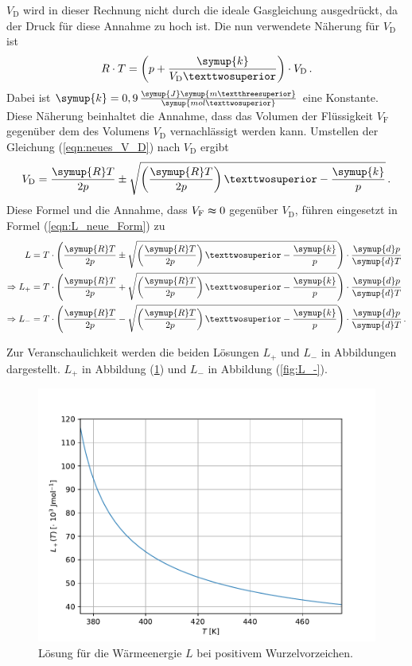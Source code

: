     $V_{\text{D}}$ wird in dieser Rechnung nicht durch die ideale Gasgleichung ausgedrückt, da der Druck für diese
    Annahme zu hoch ist. Die nun verwendete Näherung für $V_{\text{D}}$ ist
    \begin{equation}
      R \cdot T = \left(p + \frac{\symup{k}}{V_{\text{D}}²}\right) \cdot V_{\text{D}} \, .
      \label{eqn:neues_V_D}
    \end{equation}
    Dabei ist $\symup{k} = 0,9 \, \frac{\symup{J}\symup{m³}}{\symup{mol²}}$ eine Konstante. Diese Näherung 
    beinhaltet die Annahme, dass das Volumen der Flüssigkeit $V_{\text{F}}$ gegenüber dem des Volumens $V_{\text{D}}$ vernachlässigt
    werden kann. 
    Umstellen der Gleichung (\ref{eqn:neues_V_D}) nach $V_{\text{D}}$ ergibt
    \begin{equation}
      V_{\text{D}} = \frac{\symup{R}T}{2 p} \pm \sqrt{\left(\frac{\symup{R}T}{2p}\right)² - \frac{\symup{k}}{p}} \, .
    \end{equation}
    Diese Formel und die Annahme, dass $V_{\text{F}} \thickapprox 0$ gegenüber $V_{\text{D}}$, führen eingesetzt in Formel (\ref{eqn:L_neue_Form}) zu 
    \begin{align*}
      L &= T \cdot \left(\frac{\symup{R}T}{2 p} \pm \sqrt{\left(\frac{\symup{R}T}{2p}\right)² - \frac{\symup{k}}{p}}\right) \cdot \frac{\symup{d}p}{\symup{d}T} \\
      \Rightarrow L_+ &= T \cdot \left(\frac{\symup{R}T}{2 p} + \sqrt{\left(\frac{\symup{R}T}{2p}\right)² - \frac{\symup{k}}{p}}\right) \cdot \frac{\symup{d}p}{\symup{d}T} \\
      \Rightarrow L_- &= T \cdot \left(\frac{\symup{R}T}{2 p} - \sqrt{\left(\frac{\symup{R}T}{2p}\right)² - \frac{\symup{k}}{p}}\right) \cdot \frac{\symup{d}p}{\symup{d}T} \, .
    \end{align*}
    
    Zur Veranschaulichkeit werden die beiden Lösungen $L_+$ und $L_-$ in Abbildungen dargestellt. $L_+$ in Abbildung (\ref{fig:L_+}) und $L_-$ in Abbildung (\ref{fig:L_-}).
    \begin{figure}[H]
      \centering
      \includegraphics{plot4.pdf}
      \caption{Lösung für die Wärmeenergie $L$ bei positivem Wurzelvorzeichen.}
      \label{fig:L_+}
    \end{figure}

